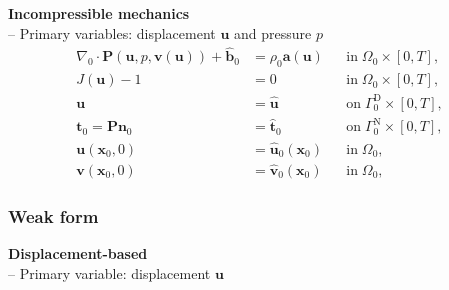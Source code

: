 \documentclass[a4paper,12pt]{report}
\newcommand{\bs}[1]{\boldsymbol{#1}}
\newcommand{\Om}{\mathit{\Omega}}
\newcommand{\Gm}{\mathit{\Gamma}}
\begin{document}
\textbf{Incompressible mechanics}\\

-- Primary variables: displacement $\bs{u}$ and pressure $p$
\begin{equation}
\label{equation-solid-strong-form-inc}
\begin{aligned}
\nabla_{0} \cdot \bs{P}(\bs{u},p,\bs{v}(\bs{u})) + \hat{\bs{b}}_{0} &= \rho_{0} \bs{a}(\bs{u}) &&\text{in} \; \mathit{\Omega}_{0} \times [0, T], \\
J(\bs{u})-1 &= 0 &&\text{in} \; \mathit{\Omega}_{0} \times [0, T], \\
\bs{u} &= \hat{\bs{u}} &&\text{on} \; \mathit{\Gamma}_{0}^{\mathrm{D}} \times [0, T],\\
\bs{t}_{0} = \bs{P}\bs{n}_{0} &= \hat{\bs{t}}_{0} &&\text{on} \; \mathit{\Gm}_{0}^{\mathrm{N}} \times [0, T],\\
\bs{u}(\bs{x}_{0},0) &= \hat{\bs{u}}_{0}(\bs{x}_{0}) &&\text{in} \; \mathit{\Om}_{0},\\
\bs{v}(\bs{x}_{0},0) &= \hat{\bs{v}}_{0}(\bs{x}_{0}) &&\text{in} \; \mathit{\Om}_{0},
\end{aligned}
\end{equation}

\subsubsection{Weak form}

\textbf{Displacement-based}\\

-- Primary variable: displacement $\bs{u}$\\
\end{document}
